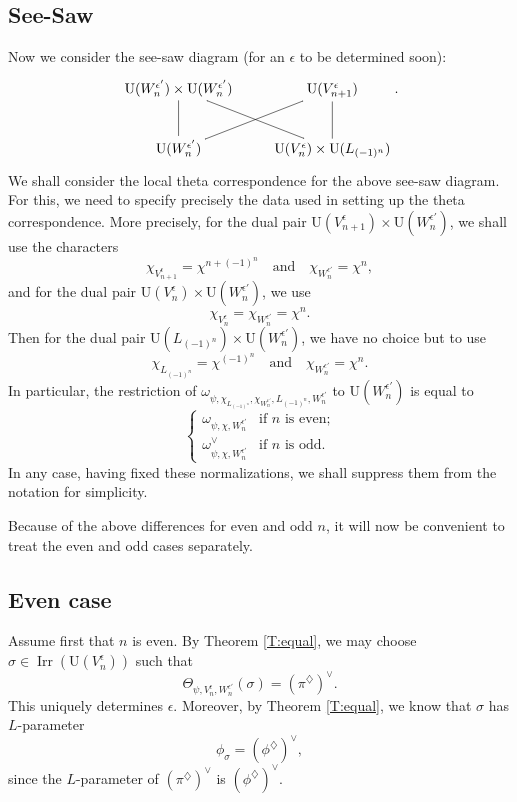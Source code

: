 \documentclass[11pt]{amsart}
\numberwithin{equation}{section}
\theoremstyle{plain}
\theoremstyle{definition}
\theoremstyle{remark}
\def\Irr{\operatorname{Irr}}
\def\U{\mathrm{U}}
\begin{document}
\subsection{See-Saw}

Now we consider the see-saw diagram (for an $\epsilon$ to be determined soon):
\[
 \xymatrix{
  \U(W_n^{\epsilon'})  \times \U(W_n^{\epsilon'})  \ar@{-}[dr] \ar@{-}[d] & \U(V^{\epsilon}_{n+1}) \ar@{-}[d] \\
  \U(W_n^{\epsilon'}) \ar@{-}[ur] &  \U(V^{\epsilon}_n) \times \U(L_{(-1)^n})}.
\]  
We shall consider the local theta correspondence for the above see-saw diagram. For this, we need to specify precisely the data used in setting up the theta correspondence. More precisely, for the dual pair $\U(V_{n+1}^\epsilon) \times \U(W_n^{\epsilon'})$, we shall use the characters
\[  \chi_{V_{n+1}^\epsilon} = \chi^{n+(-1)^n} \quad \text{and} \quad \chi_{W_n^{\epsilon'}} = \chi^n, \]
and for the dual pair $\U(V_n^\epsilon) \times \U(W_n^{\epsilon'})$, we use
\[  \chi_{V_n^\epsilon}  = \chi_{W_n^{\epsilon'}}  = \chi^n. \]
Then for the dual pair $\U(L_{(-1)^n}) \times \U(W_n^{\epsilon'})$, we have no choice but to use
\[  \chi_{L_{(-1)^n}}  = \chi^{(-1)^n} \quad \text{and} \quad \chi_{W_n^{\epsilon'}}  = \chi^n. \]
In particular, the restriction of $\omega_{\psi, \chi_{L_{(-1)^n}}, \chi_{W_n^{\epsilon'}}, L_{(-1)^n}, W_n^{\epsilon'}}$ to $\U(W_n^{\epsilon'})$ is equal to
\[  \begin{cases}
\omega_{\psi, \chi, W_n^{\epsilon'}} & \text{if $n$ is even;} \\
\omega_{\psi, \chi, W_n^{\epsilon'}}^{\vee} & \text{if $n$ is odd.} \end{cases} \]
In any case, having fixed these normalizations, we shall suppress them from the notation for simplicity.

Because of the above differences for even and odd $n$, it will now be convenient to treat the even and odd cases separately. 

\subsection{Even case}

Assume first that $n$ is even. 
By Theorem \ref{T:equal}, we may choose $\sigma \in \Irr(\U(V_n^{\epsilon}))$ such that 
\[  \Theta_{\psi, V_n^{\epsilon}, W_n^{\epsilon'}}(\sigma) =  (\pi^{\diamondsuit})^{\vee}. \] 
This uniquely determines $\epsilon$. Moreover, by Theorem \ref{T:equal}, we know that $\sigma$ has $L$-parameter
\[  \phi_{\sigma}  =  (\phi^{\diamondsuit})^{\vee}, \]
since the $L$-parameter of $ (\pi^{\diamondsuit})^{\vee}$ is $(\phi^{\diamondsuit})^{\vee}$.
\end{document}
